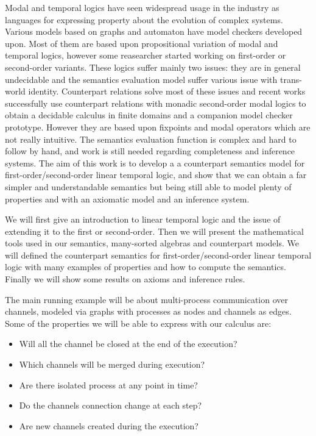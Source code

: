 Modal and temporal logics have seen widespread usage in the industry as languages for expressing property about the
evolution of complex systems. Various models based on graphs and automaton have model checkers developed upon.
Most of them are based upon propositional variation of modal and temporal logics, however some reasearcher started
working on first-order or second-order variants. These logics suffer mainly two issues: they are in general undecidable
and the semantics evaluation model suffer various issue with trans-world identity.
Counterpart relations solve most of these issues and recent works successfully use counterpart relations with monadic
second-order modal logics to obtain a decidable calculus in finite domains and a companion model checker prototype.
However they are based upon fixpoints and modal operators which are not really intuitive. The semantics evaluation
function is complex and hard to follow by hand, and work is still needed regarding completeness and inference systems.
The aim of this work is to develop a a counterpart semantics model for first-order/second-order linear temporal logic,
and show that we can obtain a far simpler and understandable semantics but being still able to model plenty of
properties and with an axiomatic model and an inference system.

We will first give an introduction to linear temporal logic and the issue of extending it to the first or
second-order. Then we will present the mathematical tools used in our semantics, many-sorted algebras and counterpart
models. We will defined the counterpart semantics for first-order/second-order linear temporal logic with many examples
of properties and how to compute the semantics. Finally we will show some results on axioms and inference rules.

The main running example will be about multi-process communication over channels, modeled via graphs with processes as
nodes and channels as edges. Some of the properties we will be able to express with our calculus are:
\begin{itemize}
  \item Will all the channel be closed at the end of the execution?
  \item Which channels will be merged during execution?
  \item Are there isolated process at any point in time?
  \item Do the channels connection change at each step?
  \item Are new channels created during the execution?
\end{itemize}
